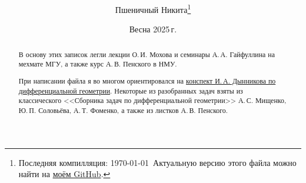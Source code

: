 \documentclass[a4paper, twoside, leqno, 11pt]{article}
\begin{document}
\title{\bfseries\scshape\course}
\date{Весна 2025\,г.}
\author{Пшеничный Никита\thanks{Последняя компилляция: \today\ Актуальную версию этого файла можно найти на \href{https://github.com/pshenikita/Differential-Geometry}{моём GitHub}.}}

\maketitle
\begin{abstract}
	В основу этих записок легли лекции О.\,И. Мохова и семинары А.\,А. Гайфуллина на мехмате МГУ, а также курс А.\,В. Пенского в НМУ.

	При написании файла я во многом ориентировался на \href{https://teach-in.ru/file/methodical/pdf/classical-difgeom-dynnikov-M.pdf}{конспект И.\,А. Дынникова по дифференциальной геометрии}. Некоторые из разобранных задач взяты из классического <<Сборника задач по дифференциальной геометрии>> А.\,С. Мищенко, Ю.\,П. Соловьёва, А.\,Т. Фоменко, а также из листков А.\,В. Пенского.
\end{abstract}

\tableofcontents




\end{document}

